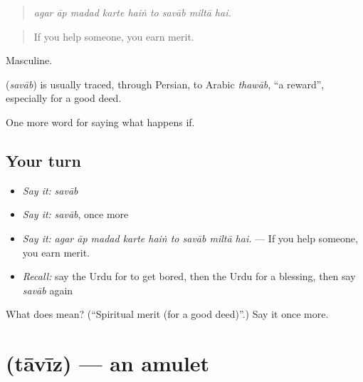 \begin{quote}
        
\end{quote}

\begin{quote}
\emph{agar āp madad karte haiṅ to savāb miltā hai.}
\end{quote}

\begin{quote}
If you help someone, you earn merit.
\end{quote}

Masculine.

\begin{cousinweb}
\textbf{} (\emph{savāb}) is usually traced, through Persian, to Arabic \emph{thawāb}, \textquotedblleft{}a reward\textquotedblright{}, especially for a good deed.
\end{cousinweb}

\begin{grammarlens}[title={What you've built}]
One more word for saying what happens if.
\end{grammarlens}

\subsection*{Your turn}
\begin{itemize}
\raggedright
  \item \emph{Say it:} \emph{savāb}
  \item \emph{Say it:} \emph{savāb}, once more
  \item \emph{Say it:} \emph{agar āp madad karte haiṅ to savāb miltā hai.} — If you help someone, you earn merit.
  \item \emph{Recall:} say the Urdu for to get bored, then the Urdu for a blessing, then say \emph{savāb} again
\end{itemize}

\begin{tcolorbox}[breakable,colback=teal!4,colframe=teal!35!black,title={Before you move on}]
What does  mean? (\textquotedblleft{}Spiritual merit (for a good deed)\textquotedblright{}.) Say it once more.
\end{tcolorbox}
\section[\texorpdfstring{\ur{تعویذ} (tāvīz)}{تعویذ (tāvīz)}]{ (tāvīz) — an amulet}

